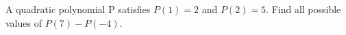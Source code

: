 A quadratic polynomial P satisfies $P(1)=2$ and $P(2)=5$. Find all possible values of $P(7)-P(-4)$.

